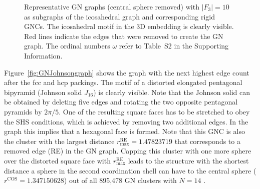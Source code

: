 \begin{figure}[htb]
    \caption{Representative GN graphs (central sphere removed) with $|F_3|=10$
    as subgraphs of the icosahedral graph and corresponding rigid GNCs. The
    icosahedral motif in the 3D embedding is clearly visible.  Red lines
    indicate the edges that were removed to create the GN graph. The ordinal
    numbers $\omega$ refer to Table~S2 in the Supporting Information.}
    \label{fig:GNicographs}
\end{figure}

Figure~\ref{fig:GNJohnsongraph} shows the graph with the next highest edge
count after the fcc and hcp packings. The motif of a distorted elongated
pentagonal bipyramid (Johnson solid $J_{16}$) is clearly visible. Note that the
Johnson solid can be obtained by deleting five edges and rotating the two
opposite pentagonal pyramids by $2\pi /5$. One of the resulting square faces
has to be stretched to obey the SHS conditions, which is achieved by removing
two additional edges. In the graph this implies that a hexagonal face is
formed. Note that this GNC is also the cluster with the largest distance
$r_\mathrm{max}^\mathrm{RE}= 1.47823719$ that corresponds to a removed edge
(RE) in the GN graph. Capping this cluster with one more sphere over the
distorted square face with $r_\mathrm{max}^\mathrm{RE}$ leads to the structure
with the shortest distance a sphere in the second coordination shell can have
to the central sphere ($r^\mathrm{COS}=1.347150628$) out of all 895,478 GN
clusters with $N=14$ \autocite{Trombach_stickyhardsphereLennardJonestypeclusters_2018}.

